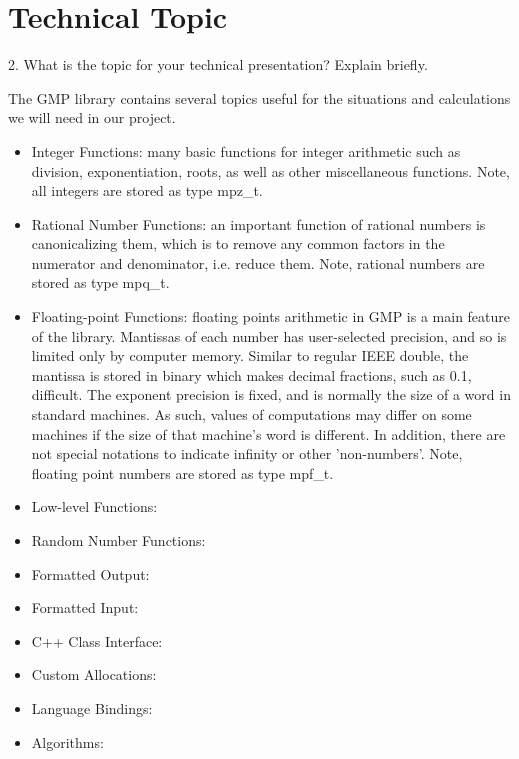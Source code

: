 \section{Technical Topic}

2. What is the topic for your technical presentation? Explain briefly.

The GMP library contains several topics useful for the situations and calculations we will need in our project.

\begin{itemize}

  \item Integer Functions: many basic functions for integer arithmetic such as division, exponentiation, roots, as well as other
  miscellaneous functions. Note, all integers are stored as type mpz_t.
  
  \item Rational Number Functions: an important function of rational numbers is canonicalizing them, which is to remove any common 
  factors in the numerator and denominator, i.e. reduce them. Note, rational numbers are stored as type mpq_t. 
  
  \item Floating-point Functions: floating points arithmetic in GMP is a main feature of the library. Mantissas of each number 
  has user-selected precision, and so is limited only by computer memory. Similar to regular IEEE double, the mantissa is stored in binary   which makes decimal fractions, such as 0.1, difficult. The exponent precision is fixed, and is normally the size of a word in standard     machines. As such, values of computations may differ on some machines if the size of that machine's word is different. In addition,       there are not special notations to indicate infinity or other 'non-numbers'. Note, floating point numbers are stored as type mpf_t.
  
  \item Low-level Functions:
  \item Random Number Functions:
  \item Formatted Output:
  \item Formatted Input:
  \item C++ Class Interface:
  \item Custom Allocations:
  \item Language Bindings:
  \item Algorithms:



\end{itemize}

